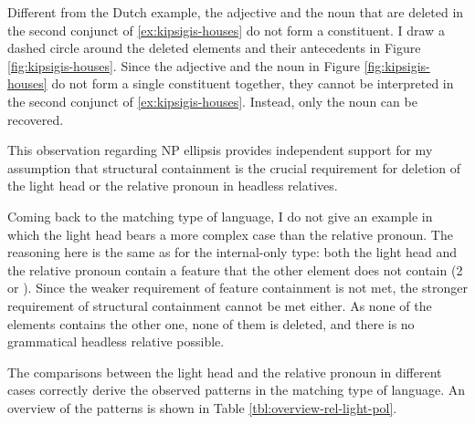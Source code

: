 Different from the Dutch example, the adjective and the noun that are deleted in the second conjunct of \ref{ex:kipsigis-houses} do not form a constituent. I draw a dashed circle around the deleted elements and their antecedents in Figure \ref{fig:kipsigis-houses}. Since the adjective and the noun in Figure \ref{fig:kipsigis-houses} do not form a single constituent together, they cannot be interpreted in the second conjunct of \ref{ex:kipsigis-houses}. Instead, only the noun can be recovered.

This observation regarding NP ellipsis provides independent support for my assumption that structural containment is the crucial requirement for deletion of the light head or the relative pronoun in headless relatives.

Coming back to the matching type of language, I do not give an example in which the light head bears a more complex case than the relative pronoun. The reasoning here is the same as for the internal-only type: both the light head and the relative pronoun contain a feature that the other element does not contain (2 or ). Since the weaker requirement of feature containment is not met, the stronger requirement of structural containment cannot be met either. As none of the elements contains the other one, none of them is deleted, and there is no grammatical headless relative possible.

The comparisons between the light head and the relative pronoun in different cases correctly derive the observed patterns in the matching type of language. An overview of the patterns is shown in Table \ref{tbl:overview-rel-light-pol}.

